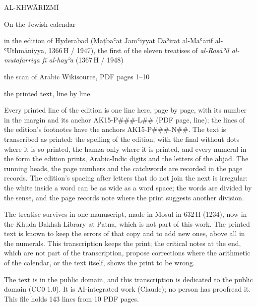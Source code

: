 \documentclass[11pt]{article}
\begin{document}
\thispagestyle{empty}
\begin{center}\Large AL-KHWĀRIZMĪ\par\vspace{4mm}\LARGE On the Jewish calendar\par{}\par\vspace{5mm}\normalsize in the edition of Hyderabad (Maṭbaʿat Jamʿiyyat Dāʾirat al-Maʿārif al-ʿUthmāniyya, 1366\,H / 1947), the first of the eleven treatises of \emph{al-Rasāʾil al-mutafarriqa fī al-hayʾa} (1367\,H / 1948)\par\vspace{3mm}the scan of Arabic Wikisource, PDF pages 1–10\par\vspace{4mm}\large the printed text, line by line\end{center}\vspace{6mm}
\noindent Every printed line of the edition is one line here, page by page, with its number in the margin and its anchor AK15-P\#\#\#-L\#\# (PDF page, line); the lines of the edition’s footnotes have the anchors AK15-P\#\#\#-N\#\#. The text is transcribed as printed: the spelling of the edition, with the final  without dots where it is so printed, the hamza only where it is printed, and every numeral in the form the edition prints, Arabic-Indic digits and the letters of the abjad. The running heads, the page numbers and the catchwords are recorded in the page records. The edition’s spacing after letters that do not join the next is irregular: the white inside a word can be as wide as a word space; the words are divided by the sense, and the page records note where the print suggests another division.
\par\smallskip\noindent The treatise survives in one manuscript, made in Mosul in 632\,H (1234), now in the Khuda Bakhsh Library at Patna, which is not part of this work. The printed text is known to keep the errors of that copy and to add new ones, above all in the numerals. This transcription keeps the print; the critical notes at the end, which are not part of the transcription, propose corrections where the arithmetic of the calendar, or the text itself, shows the print to be wrong.
\par\smallskip\noindent The text is in the public domain, and this transcription is dedicated to the public domain (CC0 1.0). It is AI-integrated work (Claude); no person has proofread it. This file holds 143 lines from 10 PDF pages.\par\clearpage
\end{document}
